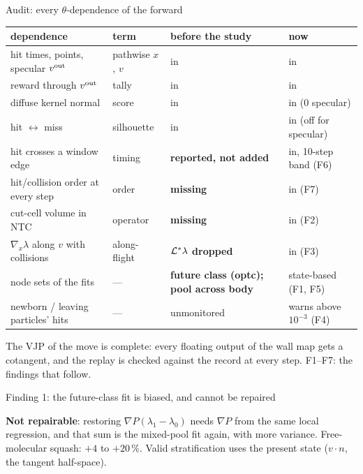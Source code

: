 \documentclass[10pt,aspectratio=169]{beamer}
\begin{document}
\begin{frame}{Audit: every $\theta$-dependence of the forward}
\footnotesize
\scriptsize
\begin{tabular}{@{}llll@{}}
\toprule
dependence & term & before the study & now\\
\midrule
hit times, points, specular $v^{\mathrm{out}}$ & pathwise $x$, $v$ & in & in\\
reward through $v^{\mathrm{out}}$ & tally & in & in\\
diffuse kernel normal & score & in & in (0 specular)\\
hit $\leftrightarrow$ miss & silhouette & in & in (off for specular)\\
hit crosses a window edge & timing & \textbf{reported, not added} & in, 10-step band (F6)\\
hit/collision order at every step & order & \textbf{missing} & in (F7)\\
cut-cell volume in NTC & operator & \textbf{missing} & in (F2)\\
$\nabla_x\lambda$ along $v$ with collisions & along-flight & \textbf{$\mathcal L^*\lambda$ dropped} & in (F3)\\
node sets of the fits & --- & \textbf{future class (optc); pool across body} & state-based (F1, F5)\\
newborn / leaving particles' hits & --- & unmonitored & warns above $10^{-3}$ (F4)\\
\bottomrule
\end{tabular}

\medskip
The VJP of the move is complete: every floating output of the wall map gets a cotangent, and the
replay is checked against the record at every step.  F1--F7: the findings that follow.
\end{frame}

\begin{frame}{Finding 1: the future-class fit is biased, and cannot be repaired}
\footnotesize
\renewcommand{\medskip}{\smallskip}


\scriptsize
\textbf{Not repairable}: restoring $\nabla P(\lambda_1 - \lambda_0)$ needs $\nabla P$ from the same local
regression, and that sum is the mixed-pool fit again, with more variance.  Free-molecular squash:
$+4$ to $+20\,\%$.  Valid stratification uses the present state ($v\cdot n$, the tangent half-space).
\end{frame}
\end{document}
